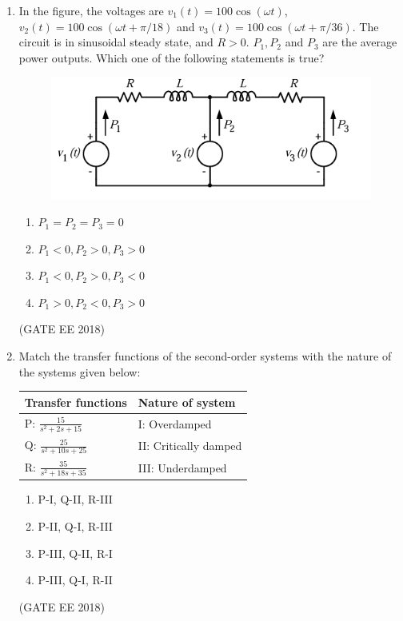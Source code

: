 \documentclass[journal,12pt,onecolumn]{IEEEtran}
\theoremstyle{remark}
\begin{document}
\begin{enumerate}
    \item In the figure, the voltages are $v_{1}(t) = 100 \cos(\omega t)$, $v_{2}(t) = 100 \cos(\omega t + \pi/18)$ and $v_{3}(t) = 100 \cos(\omega t + \pi/36)$. The circuit is in sinusoidal steady state, and $R > 0$. $P_{1}, P_{2}$ and $P_{3}$ are the average power outputs. Which one of the following statements is true?
    \begin{figure}[H]
    \centering
    \includegraphics[]{figs/Q.8.png}
    \caption{}
    \label{fig:3}
\end{figure}
    \begin{multicols}{2}
    \begin{enumerate}
        \item $P_{1} = P_{2} = P_{3} = 0$
        \item $P_{1} < 0, P_{2} > 0, P_{3} > 0$
        \item $P_{1} < 0, P_{2} > 0, P_{3} < 0$
        \item $P_{1} > 0, P_{2} < 0, P_{3} > 0$
    \end{enumerate}
    \end{multicols}
\hfill{(GATE EE 2018)}

    \item Match the transfer functions of the second-order systems with the nature of the systems given below:
    \begin{tabular}{|l|l|}
        \hline
        \textbf{Transfer functions} & \textbf{Nature of system} \\
        \hline
        P: $\frac{15}{s^{2}+2s+15}$ & I: Overdamped \\
        Q: $\frac{25}{s^{2}+10s+25}$ & II: Critically damped \\
        R: $\frac{35}{s^{2}+18s+35}$ & III: Underdamped \\
        \hline
    \end{tabular}
    \begin{multicols}{2}
    \begin{enumerate}
        \item P-I, Q-II, R-III
        \item P-II, Q-I, R-III
        \item P-III, Q-II, R-I
        \item P-III, Q-I, R-II
    \end{enumerate}
    \end{multicols}
\hfill{(GATE EE 2018)}


\end{enumerate}
\end{document}
